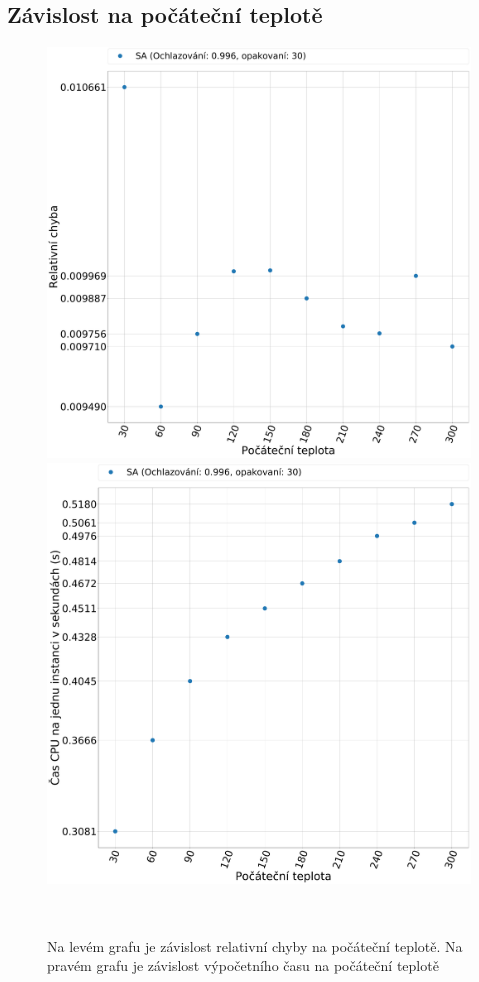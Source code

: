 \documentclass[11pt]{article}
\begin{document}
\subsection{Závislost na počáteční teplotě}
\begin{figure}
	\centering
    \begin{minipage}[c]{0.42\textwidth}
        \centering\includegraphics[width=\textwidth]{img/TE.pdf} 
    \end{minipage}
    \begin{minipage}[c]{0.42\textwidth}
        \centering \includegraphics[width=\textwidth]{img/TT.pdf} 
    \end{minipage}
    \\
   \caption{Na levém grafu je závislost relativní chyby na počáteční teplotě. Na pravém grafu je závislost výpočetního času na počáteční teplotě}\label{fig:GZNT}
\end{figure} 
\end{document}
